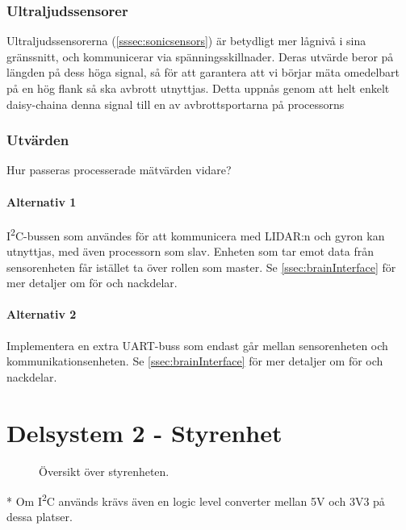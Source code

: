 \documentclass[a4paper,11pt]{article}
\begin{document}
\subsubsection{Ultraljudssensorer}
Ultraljudssensorerna (\ref{sssec:sonicsensors}) är betydligt mer lågnivå i sina gränssnitt, och kommunicerar via spänningsskillnader. Deras utvärde beror på längden på dess höga signal, så för att garantera att vi börjar mäta omedelbart på en hög flank så ska avbrott utnyttjas. Detta uppnås genom att helt enkelt daisy-chaina denna signal till en av avbrottsportarna på processorns

\subsubsection{Utvärden}
Hur passeras processerade mätvärden vidare?

\paragraph{Alternativ 1}
I\textsuperscript{2}C-bussen som användes för att kommunicera med LIDAR:n och gyron kan utnyttjas, med även processorn som slav. Enheten som tar emot data från sensorenheten får istället ta över rollen som master. Se \ref{ssec:brainInterface} för mer detaljer om för och nackdelar.

\paragraph{Alternativ 2}
Implementera en extra UART-buss som endast går mellan sensorenheten och kommunikationsenheten. Se \ref{ssec:brainInterface} för mer detaljer om för och nackdelar.

\newpage
\section{Delsystem 2 - Styrenhet} \label{sec:system2}
\begin{figure}[h!]
    \caption{Översikt över styrenheten.}
    \label{fig:modules}
\end{figure}
\noindent \begin{small}
    * Om I\textsuperscript{2}C används krävs även en logic level converter mellan 5V och 3V3 på dessa platser.
\end{small}
\end{document}
